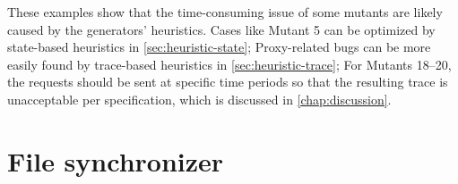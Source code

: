 These examples show that the time-consuming issue of some mutants are likely
caused by the generators' heuristics.  Cases like Mutant 5 can be optimized by
state-based heuristics in \autoref{sec:heuristic-state}; Proxy-related bugs can
be more easily found by trace-based heuristics in \autoref{sec:heuristic-trace};
For Mutants 18--20, the requests should be sent at specific time periods so that
the resulting trace is unacceptable per specification, which is discussed in
\autoref{chap:discussion}.

\section{File synchronizer}
\label{sec:sync}
